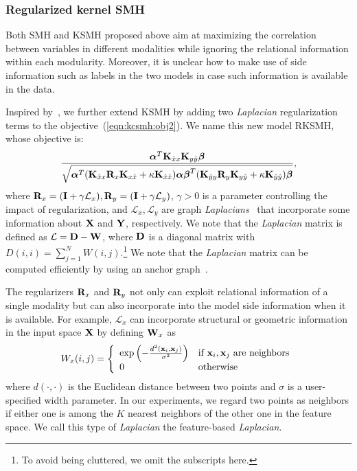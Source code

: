 \subsubsection{Regularized kernel \mbox{SMH}}
\label{smh:Ssmh:EXT:RKSMH}

Both \mbox{SMH} and \mbox{KSMH} proposed above aim at maximizing the correlation between variables in different modalities while ignoring the relational information within each modularity.  Moreover, it is unclear how to make use of side information such as labels in the two models in case such information is available in the data.

Inspired by~\cite{blaschko2008ecml}, we further extend \mbox{KSMH} by adding two \textit{Laplacian} regularization terms to the objective~(\ref{eqn:kcsmh:obj2}). We name this new model \mbox{RKSMH}, whose objective is:
\begin{align}
\frac{\mbox{\boldmath$\alpha$\unboldmath}^{T}{\bf K}_{\hat{x}x}{\bf K}_{y\hat{y}}\mbox{\boldmath$\beta$\unboldmath}}{\sqrt{\mbox{\boldmath$\alpha$\unboldmath}^{T}({\bf K}_{\hat{x}x}{\bf R}_{x}{\bf K}_{x\hat{x}}+\kappa{\bf K}_{\hat{x}\hat{x}})\mbox{\boldmath$\alpha$\unboldmath}\mbox{\boldmath$\beta$\unboldmath}^{T}({\bf K}_{\hat{y}y}{\bf R}_{y}{\bf K}_{y\hat{y}}+\kappa{\bf K}_{\hat{y}\hat{y}})\mbox{\boldmath$\beta$\unboldmath}}},\nonumber
\end{align}
where ${\bf R}_{x} = ({\bf I}+\gamma\mathcal{L}_{x}),{\bf R}_{y} = ({\bf I}+\gamma\mathcal{L}_{y})$, $\gamma>0$ is a parameter controlling the impact of regularization, and $\mathcal{L}_{x},\mathcal{L}_{y}$ are graph \textit{Laplacians}~\cite{chung1997spectral} that incorporate some information about ${\bf X}$ and ${\bf Y}$, respectively. We note that the \textit{Laplacian} matrix is defined as $\mathcal{L} = {\bf D}-{\bf W}$, where ${\bf D}$ is a diagonal matrix with $D(i,i) = \sum_{j=1}^{N}W(i,j)$.\footnote{To avoid being cluttered, we omit the subscripts here.} We note that the \textit{Laplacian} matrix can be computed efficiently by using an anchor graph~\cite{liu2010icml}.

The regularizers $ {\bf R}_{x} $ and $ {\bf R}_{y} $ not only can exploit relational information of a single modality but can also incorporate into the model side information when it is available. For example, $\mathcal{L}_{x}$ can incorporate structural or geometric information in the input space $ {\bf X} $ by defining ${\bf W}_{x}$ as
\begin{align}
\label{eqn:wfeature}
W_{x}(i,j) = \left\{ \begin{array}{ll}
\exp\left(-\frac{d^2({\bf x}_i,{\bf x}_j)}{\sigma^2}\right) & \textrm{if ${\bf x}_i,{\bf x}_j$ are neighbors}\\
0 & \textrm{otherwise}
\end{array} \right.
\end{align}
where $d(\cdot,\cdot)$ is the Euclidean distance between two points and $\sigma$ is a user-specified width parameter. In our experiments, we regard two points as neighbors if either one is among the $K$ nearest neighbors of the other one in the feature space. We call this type of \textit{Laplacian} the feature-based \textit{Laplacian}.


